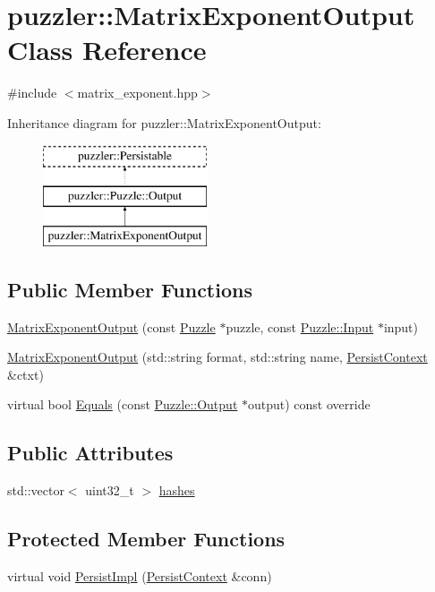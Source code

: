 \hypertarget{a00016}{}\section{puzzler\+:\+:Matrix\+Exponent\+Output Class Reference}
\label{a00016}


{\ttfamily \#include $<$matrix\+\_\+exponent.\+hpp$>$}

Inheritance diagram for puzzler\+:\+:Matrix\+Exponent\+Output\+:\begin{figure}[H]
\begin{center}
\leavevmode
\includegraphics[height=3.000000cm]{a00016}
\end{center}
\end{figure}
\subsection*{Public Member Functions}
\begin{DoxyCompactItemize}
\item 
\hyperlink{a00016_a6289ff3c310e540b00fd9b9b4207eaff}{Matrix\+Exponent\+Output} (const \hyperlink{a00026}{Puzzle} $\ast$puzzle, const \hyperlink{a00009}{Puzzle\+::\+Input} $\ast$input)
\item 
\hyperlink{a00016_ad9f7e98f072005bc7c9206b5b5fe4eb4}{Matrix\+Exponent\+Output} (std\+::string format, std\+::string name, \hyperlink{a00025}{Persist\+Context} \&ctxt)
\item 
virtual bool \hyperlink{a00016_a2bb02456a1fa4298038303a7ad0c3eee}{Equals} (const \hyperlink{a00023}{Puzzle\+::\+Output} $\ast$output) const override
\end{DoxyCompactItemize}
\subsection*{Public Attributes}
\begin{DoxyCompactItemize}
\item 
std\+::vector$<$ uint32\+\_\+t $>$ \hyperlink{a00016_a9b891f8e2007f094085a8f41852e58b3}{hashes}
\end{DoxyCompactItemize}
\subsection*{Protected Member Functions}
\begin{DoxyCompactItemize}
\item 
virtual void \hyperlink{a00016_ab29a2f912c55c0c027d7fd2bf023c41c}{Persist\+Impl} (\hyperlink{a00025}{Persist\+Context} \&conn)
\end{DoxyCompactItemize}


